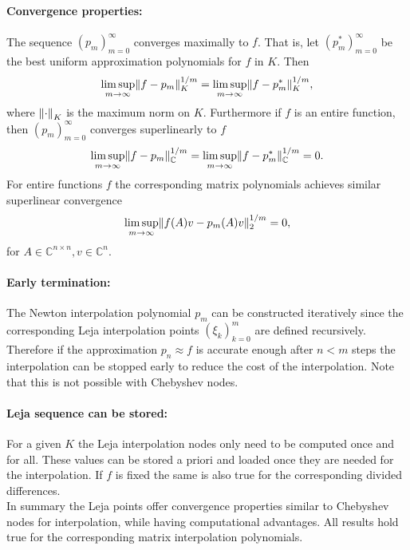 \documentclass{scrartcl}
\begin{document}
	\paragraph{Convergence properties:}
	The sequence $(p_m)_{m=0}^\infty$ converges maximally to $f$. That is, let $(p_m^{*})_{m=0}^\infty$ be the best uniform approximation polynomials for $f$ in $K$. Then
	\[\limsup\limits_{m \rightarrow \infty}\lVert f-p_m\rVert_{K}^{1/m} = \limsup\limits_{m \rightarrow \infty}\lVert f-p_m^{*}\rVert_{K}^{1/m},\]
	where ${\lVert\cdot\rVert}_K$ is the maximum norm on $K$. Furthermore if $f$ is an entire function, then $(p_m)_{m=0}^\infty$ converges superlinearly to $f$
	\[\limsup\limits_{m \rightarrow \infty}\lVert f-p_m\rVert_{\mathbb{C}}^{1/m} = \limsup\limits_{m \rightarrow \infty}\lVert f-p_m^{*}\rVert_{\mathbb{C}}^{1/m} = 0. \]
	For entire functions $f$ the corresponding matrix polynomials achieves similar superlinear convergence
	\[\limsup\limits_{m \rightarrow \infty}\lVert f(A)v-p_m(A)v\rVert_{2}^{1/m} = 0, \]
	for $A\in\mathbb{C}^{n\times n}, v\in\mathbb{C}^n$.
	
	\paragraph{Early termination:}
	The Newton interpolation polynomial $p_m$ can be constructed iteratively since the corresponding Leja interpolation points $(\xi_k)_{k=0}^{m}$ are defined recursively. Therefore if the approximation $p_n \approx f$ is accurate enough after $n<m$ steps the interpolation can be stopped early to reduce the cost of the interpolation. Note that this is not possible with Chebyshev nodes.
	
	\paragraph{Leja sequence can be stored:}
	For a given $K$ the Leja interpolation nodes only need to be computed once and for all. These values can be stored a priori and loaded once they are needed for the interpolation. If $f$ is fixed the same is also true for the corresponding divided differences. \\
	
	In summary the Leja points offer convergence properties similar to Chebyshev nodes for interpolation, while having computational advantages. All results hold true for the corresponding matrix interpolation polynomials.
	
\end{document}
